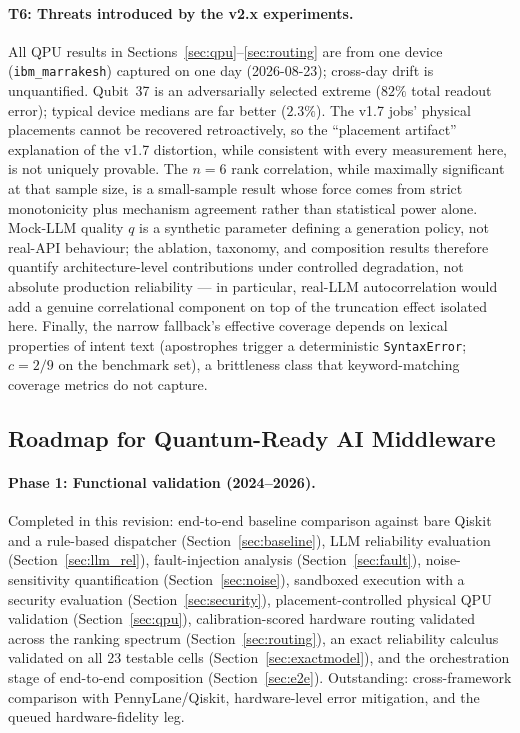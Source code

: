 ﻿\documentclass[12pt,a4paper]{article}
\begin{document}
\paragraph{T6: Threats introduced by the v2.x experiments.} All QPU results in Sections~\ref{sec:qpu}--\ref{sec:routing} are from one device (\texttt{ibm\_marrakesh}) captured on one day (2026-08-23); cross-day drift is unquantified. Qubit~37 is an adversarially selected extreme ($82\%$ total readout error); typical device medians are far better ($2.3\%$). The v1.7 jobs' physical placements cannot be recovered retroactively, so the ``placement artifact'' explanation of the v1.7 distortion, while consistent with every measurement here, is not uniquely provable. The $n{=}6$ rank correlation, while maximally significant at that sample size, is a small-sample result whose force comes from strict monotonicity plus mechanism agreement rather than statistical power alone. Mock-LLM quality $q$ is a synthetic parameter defining a generation policy, not real-API behaviour; the ablation, taxonomy, and composition results therefore quantify architecture-level contributions under controlled degradation, not absolute production reliability --- in particular, real-LLM autocorrelation would add a genuine correlational component on top of the truncation effect isolated here. Finally, the narrow fallback's effective coverage depends on lexical properties of intent text (apostrophes trigger a deterministic \texttt{SyntaxError}; $c = 2/9$ on the benchmark set), a brittleness class that keyword-matching coverage metrics do not capture.

\subsection{Roadmap for Quantum-Ready AI Middleware}\label{sec:roadmap}

\paragraph{Phase 1: Functional validation (2024--2026).} Completed in this revision: end-to-end baseline comparison against bare Qiskit and a rule-based dispatcher (Section~\ref{sec:baseline}), LLM reliability evaluation (Section~\ref{sec:llm_rel}), fault-injection analysis (Section~\ref{sec:fault}), noise-sensitivity quantification (Section~\ref{sec:noise}), sandboxed execution with a security evaluation (Section~\ref{sec:security}), placement-controlled physical QPU validation (Section~\ref{sec:qpu}), calibration-scored hardware routing validated across the ranking spectrum (Section~\ref{sec:routing}), an exact reliability calculus validated on all 23 testable cells (Section~\ref{sec:exactmodel}), and the orchestration stage of end-to-end composition (Section~\ref{sec:e2e}). Outstanding: cross-framework comparison with PennyLane/Qiskit, hardware-level error mitigation, and the queued hardware-fidelity leg.
\end{document}
